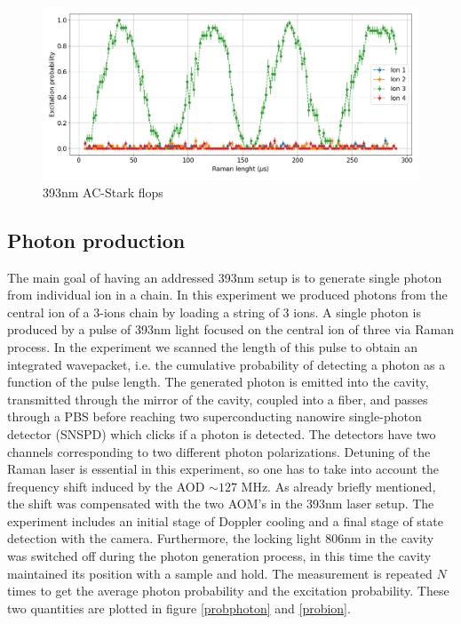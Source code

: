 \begin{figure}[H]
\centering
\includegraphics[width=\textwidth]{img/ACscan}
\caption{393nm AC-Stark flops}
\label{ACscan}
\end{figure}

\subsection{Photon production}
\label{exp:photons}
The main goal of having an addressed 393nm setup is to generate single photon from individual ion in a chain. In this experiment we produced photons from the central ion of a 3-ions chain by loading a string of 3 ions. A single photon is produced by a pulse of 393nm light focused on the central ion of three via Raman process. In the experiment we scanned the length of this pulse to obtain an integrated wavepacket, i.e. the cumulative probability of detecting a photon as a function of the pulse length. The generated photon is emitted into the cavity, transmitted through the mirror of the cavity, coupled into a fiber, and passes through a PBS before reaching two superconducting nanowire single-photon detector (SNSPD) which clicks if a photon is detected. The detectors have two channels corresponding to two different photon polarizations. Detuning of the Raman laser is essential in this experiment, so one has to take into account the frequency shift induced by the AOD $\sim 127$ MHz. As already briefly mentioned, the shift was compensated with the two AOM's in the 393nm laser setup. The experiment includes an initial stage of Doppler cooling and a final stage of state detection with the camera. Furthermore, the locking light 806nm in the cavity was switched off during the photon generation process, in this time the cavity maintained its position with a sample and hold. The measurement is repeated $N$ times to get the average photon probability and the excitation probability. These two quantities are plotted in figure \ref{probphoton} and \ref{probion}.
